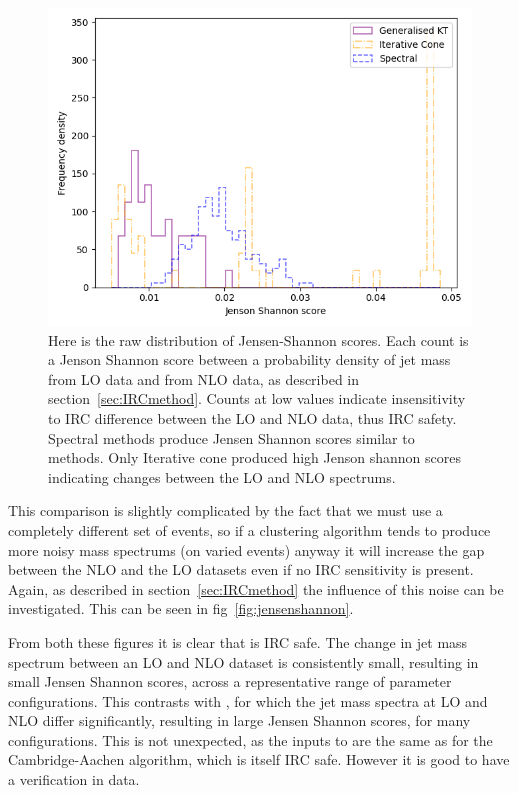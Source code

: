 \begin{figure}[htp]
    \begin{minipage}[c]{0.6\textwidth}
    \includegraphics[width=1.\textwidth]{graphics/JensenShannon_unnormed.png}
    \end{minipage}\hfill
    \begin{minipage}[c]{0.35\textwidth}
    \caption{Here is the raw distribution of Jensen-Shannon scores.
        Each count is a Jenson Shannon score between a probability density of jet mass from LO data and
        from NLO data, as described in section~\ref{sec:IRCmethod}.
        Counts at low values indicate insensitivity to IRC difference between the LO and NLO data,
        thus IRC safety.
        Spectral methods produce Jensen Shannon scores similar to \genkt{}
        methods. Only Iterative cone produced high Jenson shannon scores indicating changes
        between the LO and NLO spectrums.
     }\label{fig:unnormedJS}
    \end{minipage}
\end{figure}    

This comparison is slightly complicated by the fact that we must use a completely different set of events,
so if a clustering algorithm tends to produce more noisy mass spectrums (on varied events)
anyway it will increase the gap between the NLO and the LO datasets even if no IRC sensitivity is present.
Again, as described in section~\ref{sec:IRCmethod} the influence of this noise can be investigated.
This can be seen in fig~\ref{fig:jensenshannon}.

From both these figures it is clear that \spectral{} is IRC safe.
The change in jet mass spectrum between an LO and NLO dataset is consistently small,
resulting in small Jensen Shannon scores,
across a representative range of parameter configurations.
This contrasts with \itercone{}, for which the jet mass spectra at LO and NLO 
differ significantly, resulting in large Jensen Shannon scores, for many configurations.
This is not unexpected, as the inputs to \spectral{}
are the same as for the Cambridge-Aachen algorithm, 
which is itself IRC safe.
However it is good to have a verification in data.

